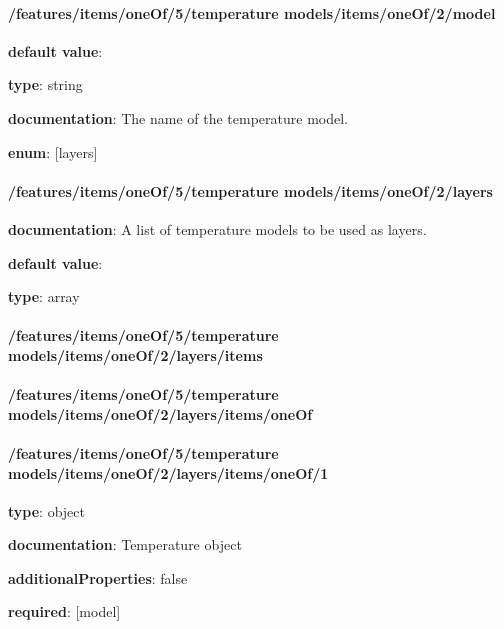 \paragraph{/features/items/oneOf/5/temperature models/items/oneOf/2/model} \begin{itemized}
\item {\bf default value}: 
\item {\bf type}: string
\item {\bf documentation}: The name of the temperature model.
\item {\bf enum}: [layers]\end{itemized}\paragraph{/features/items/oneOf/5/temperature models/items/oneOf/2/layers} \begin{itemized}
\item {\bf documentation}: A list of temperature models to be used as layers.
\item {\bf default value}: 
\item {\bf type}: array
\paragraph{/features/items/oneOf/5/temperature models/items/oneOf/2/layers/items} \begin{itemized}
\end{itemized}\end{itemized}\paragraph{/features/items/oneOf/5/temperature models/items/oneOf/2/layers/items/oneOf} \begin{itemized}
\end{itemized}\paragraph{/features/items/oneOf/5/temperature models/items/oneOf/2/layers/items/oneOf/1} \begin{itemized}
\item {\bf type}: object
\item {\bf documentation}: Temperature object
\item {\bf additionalProperties}: false
\item {\bf required}: [model]\end{itemized}

